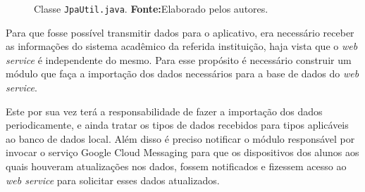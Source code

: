 	\begin{figure}[h!]
		
		\caption[Classe \texttt{JpaUtil.java}]{Classe \texttt{JpaUtil.java}.
		\textbf{Fonte:}Elaborado pelos autores.}
		\label{fig:qm12}
	\end{figure}

	\pagebreak
		
		

	\par Para que fosse possível transmitir dados para o aplicativo, era
necessário receber as informações do sistema acadêmico da referida instituição,
haja vista que o \textit{web service} é independente do mesmo. Para esse
propósito é necessário  construir um módulo que faça a importação dos dados
necessários para a base de dados do \textit{web service}. 

	\par Este por sua vez terá a responsabilidade de fazer a importação dos dados
periodicamente, e ainda tratar os tipos de dados recebidos para tipos
aplicáveis ao banco de dados local. Além disso é preciso notificar o módulo
responsável por invocar o serviço Google Cloud Messaging para que os
dispositivos dos alunos aos quais houveram atualizações nos dados, fossem
notificados e fizessem acesso ao \textit{web service} para solicitar esses
dados atualizados.

